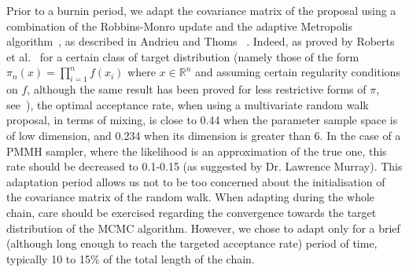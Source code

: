 \documentclass[12pt]{article}
\begin{document}
\clearpage
	Prior to a burnin period, we adapt the covariance matrix of the proposal using a combination of the Robbins-Monro update and the adaptive Metropolis algorithm~\cite{haario2001adaptive}, as described in Andrieu and Thoms ~\cite[~Algorithm 5]{Andrieu2008}. Indeed, as proved by Roberts et al.~\cite{roberts1997weak} for a certain class of target distribution (namely those of the form $\pi_n(x) = \prod_{i=1}^{n}f(x_i)$ where $x \in \mathbb{R}^n$ and assuming certain regularity conditions on $f$, although the same result has been proved for less restrictive forms of $\pi$, see~\cite{roberts2001optimal}), the optimal acceptance rate, when using a multivariate random walk proposal, in terms of mixing, is close to 0.44 when the parameter sample space is of low dimension, and 0.234 when its dimension is greater than 6. In the case of a PMMH sampler, where the likelihood is an approximation of the true one, this rate should be decreased to 0.1-0.15 (as suggested by Dr. Lawrence Murray). This adaptation period allows us not to be too concerned about the initialisation of the covariance matrix of the random walk. When adapting during the whole chain, care should be exercised regarding the convergence towards the target distribution of the MCMC algorithm. However, we chose to adapt only for a brief (although long enough to reach the targeted acceptance rate) period of time, typically 10 to 15\% of the total length of the chain.
	
\end{document}
